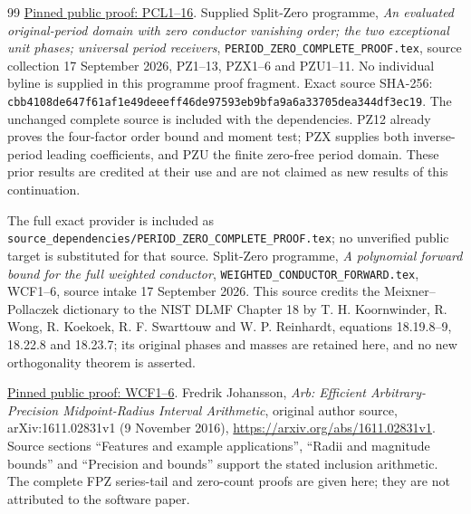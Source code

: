 \documentclass[11pt]{article}
\begin{document}
\begin{thebibliography}{99}
\href{https://github.com/KokunoYumeto/zeta-function-research-reader/blob/487253b5b01851da5b9b98af4e146fecf1fab902/workbenches/splitzero-tandem/continuations/20260919-native-conductor-coprimality/providers/PCL_COMPLETE.tex#L19}{Pinned public proof: PCL1--16}.
 Supplied Split-Zero programme,
\emph{An evaluated original-period domain with zero conductor vanishing
order; the two exceptional unit phases; universal period receivers},
\texttt{PERIOD\_ZERO\_COMPLETE\_PROOF.tex}, source collection
17 September 2026, PZ1--13, PZX1--6 and PZU1--11.
No individual byline is supplied in this programme proof fragment.
Exact source SHA-256:
\texttt{cbb4108de647f61af1e49deeeff46de97593eb9bfa9a6a33705dea344df3ec19}.
The unchanged complete source is included with the dependencies.
PZ12 already proves the four-factor order bound and moment test;
PZX supplies both inverse-period leading coefficients, and PZU the
finite zero-free period domain. These prior results are credited
at their use and are not claimed as new results of this continuation.


 The full exact provider is included as
\nolinkurl{source_dependencies/PERIOD_ZERO_COMPLETE_PROOF.tex};
no unverified public target is substituted for that source.
 Split-Zero programme, \emph{A polynomial forward bound for
the full weighted conductor}, \texttt{WEIGHTED\_CONDUCTOR\_FORWARD.tex},
WCF1--6, source intake 17 September 2026. This source credits the
Meixner--Pollaczek dictionary to the NIST DLMF Chapter 18 by T. H. Koornwinder, R. Wong, R. Koekoek, R. F. Swarttouw and W. P. Reinhardt, equations
18.19.8--9, 18.22.8 and 18.23.7; its original phases and masses are
retained here, and no new orthogonality theorem is asserted.

\href{https://github.com/KokunoYumeto/zeta-function-research-reader/blob/5992ad50c0f2a06921f1fcaded7b4e38097c0739/workbenches/splitzero-tandem/continuations/20260920-original-kernel-mixed-determinants/providers/WEIGHTED_CONDUCTOR_FORWARD.tex#L28}{Pinned public proof: WCF1--6}.
 Fredrik Johansson,
\emph{Arb: Efficient Arbitrary-Precision Midpoint-Radius Interval Arithmetic},
original author source, arXiv:1611.02831v1 (9 November 2016),
\url{https://arxiv.org/abs/1611.02831v1}.
Source sections ``Features and example applications'', ``Radii and
magnitude bounds'' and ``Precision and bounds'' support the stated
inclusion arithmetic. The complete FPZ series-tail and zero-count proofs
are given here; they are not attributed to the software paper.
\end{thebibliography}
\end{document}
